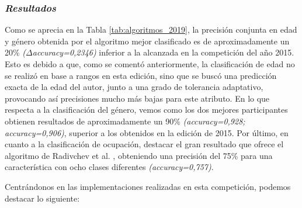 \subsubsection{\textit{Resultados}}

Como se aprecia en la Tabla \ref{tab:algoritmos_2019}, la precisión conjunta en edad y género obtenida por el algoritmo mejor
clasificado es de aproximadamente un 20\% \textit{($\Delta$accuracy=0,2346)} inferior a la alcanzada en la competición del año 2015. Esto es debido a que,
como se comentó anteriormente, la clasificación de edad no se realizó en base a rangos en esta edición, sino que se
buscó una predicción exacta de la edad del autor, junto a una grado de tolerancia adaptativo, provocando así precisiones mucho
más bajas para este atributo. En lo que respecta a la clasificación del género, vemos como los dos
mejores participantes obtienen resultados de aproximadamente un 90\% \textit{(accuracy=0,928; accuracy=0,906)}, superior a los obtenidos en la edición de 2015.
Por último, en cuanto a la clasificación de ocupación, destacar el gran resultado que ofrece el algoritmo de Radivchev et al. \cite{radivchev2019celebrity},
obteniendo una precisión del 75\% para una característica con ocho clases diferentes \textit{(accuracy=0,757)}.

\bigskip
Centrándonos en las implementaciones realizadas en esta competición, podemos destacar lo siguiente:

